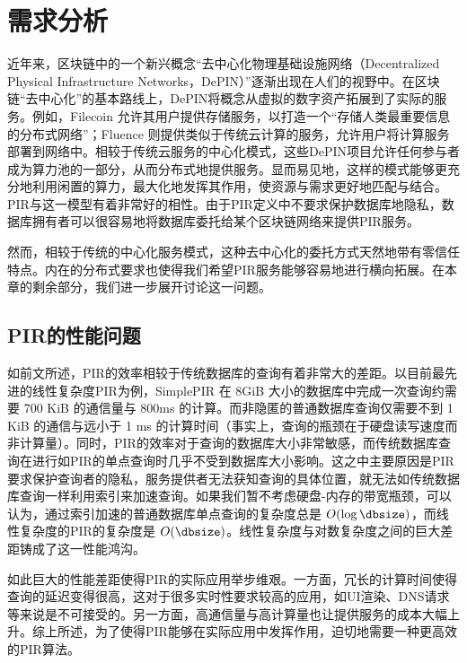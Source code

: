 \section{需求分析}

近年来，区块链中的一个新兴概念“去中心化物理基础设施网络（Decentralized Physical Infrastructure Networks，DePIN）”逐渐出现在人们的视野中。在区块链“去中心化”的基本路线上，DePIN将概念从虚拟的数字资产拓展到了实际的服务。例如，Filecoin \cite{filecoin} 允许其用户提供存储服务，以打造一个“存储人类最重要信息的分布式网络”；Fluence \cite{fluence} 则提供类似于传统云计算的服务，允许用户将计算服务部署到网络中。相较于传统云服务的中心化模式，这些DePIN项目允许任何参与者成为算力池的一部分，从而分布式地提供服务。显而易见地，这样的模式能够更充分地利用闲置的算力，最大化地发挥其作用，使资源与需求更好地匹配与结合。PIR与这一模型有着非常好的相性。由于PIR定义中不要求保护数据库地隐私，数据库拥有者可以很容易地将数据库委托给某个区块链网络来提供PIR服务。

然而，相较于传统的中心化服务模式，这种去中心化的委托方式天然地带有零信任特点。内在的分布式要求也使得我们希望PIR服务能够容易地进行横向拓展。在本章的剩余部分，我们进一步展开讨论这一问题。
\subsection{PIR的性能问题}
如前文所述，PIR的效率相较于传统数据库的查询有着非常大的差距。以目前最先进的线性复杂度PIR为例，SimplePIR \cite{SimplePIR} 在 8GiB 大小的数据库中完成一次查询约需要 700 KiB 的通信量与 800ms 的计算。而非隐匿的普通数据库查询仅需要不到 1 KiB 的通信与远小于 1 ms 的计算时间（事实上，查询的瓶颈在于硬盘读写速度而非计算量）。同时，PIR的效率对于查询的数据库大小非常敏感，而传统数据库查询在进行如PIR的单点查询时几乎不受到数据库大小影响。这之中主要原因是PIR要求保护查询者的隐私，服务提供者无法获知查询的具体位置，就无法如传统数据库查询一样利用索引来加速查询。如果我们暂不考虑硬盘-内存的带宽瓶颈，可以认为，通过索引加速的普通数据库单点查询的复杂度总是 $O(\log\dbsize)$，而线性复杂度的PIR的复杂度是 $O(\dbsize)$。线性复杂度与对数复杂度之间的巨大差距铸成了这一性能鸿沟。

如此巨大的性能差距使得PIR的实际应用举步维艰。一方面，冗长的计算时间使得查询的延迟变得很高，这对于很多实时性要求较高的应用，如UI渲染、DNS请求等来说是不可接受的。另一方面，高通信量与高计算量也让提供服务的成本大幅上升。综上所述，为了使得PIR能够在实际应用中发挥作用，迫切地需要一种更高效的PIR算法。

